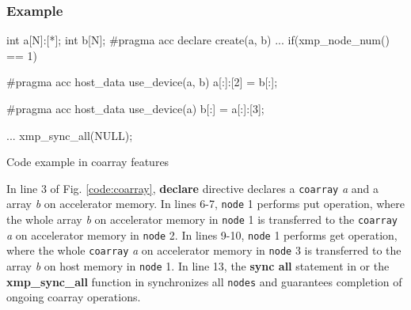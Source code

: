 \subsubsection*{Example}
\begin{myfigure}
\begin{minipage}{0.45\hsize}
\begin{center}
\end{center}
\end{minipage}
%
\begin{minipage}{0.53\hsize}
\begin{center}
\begin{XACCCexampleR}
int a[N]:[*];
int b[N];
#pragma acc declare create(a, b)
...
if(xmp_node_num() == 1){
#pragma acc host_data use_device(a, b)
  a[:]:[2] = b[:];

#pragma acc host_data use_device(a)
  b[:] = a[:]:[3];
}
...
xmp_sync_all(NULL);
\end{XACCCexampleR}
\end{center}
\end{minipage}
\caption{Code example in {\XACC} coarray features}\label{code:coarray}
\end{myfigure}

In line 3 of Fig. \ref{code:coarray},
{\OACC} {\bf declare} directive declares a {\tt coarray} {\it a} and a array {\it b} on accelerator memory.
In lines 6-7,
{\tt node} 1 performs put operation, where
the whole array {\it b} on accelerator memory in {\tt node} 1 is transferred to the {\tt coarray} {\it a} on accelerator memory in {\tt node} 2.
In lines 9-10,
{\tt node} 1 performs get operation, where
the whole {\tt coarray} {\it a} on accelerator memory in {\tt node} 3 is transferred to the array {\it b} on host memory in {\tt node} 1.
In line 13,
the {\bf sync all} statement in {\XACCF} or the {\bf xmp\_sync\_all} function in {\XACCC} synchronizes all {\tt nodes} and guarantees completion of ongoing coarray operations.

